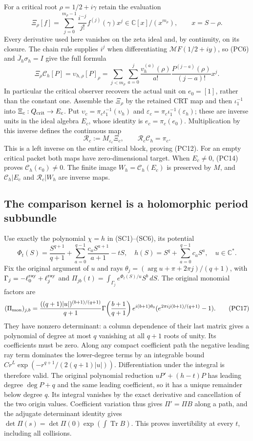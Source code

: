 \documentclass{article}
\begin{document}
For a critical root $\rho=1/2+i\gamma$ retain the evaluation
\[
 \Xi_\rho[f]=\sum_{j=0}^{m_\rho-1}
       \frac{i^{-j}}{j!}f^{(j)}(\gamma)x^j
       \in\mathbb C[x]/(x^{m_\rho}),\qquad x=S-\rho.
 \tag{PC13}
\]
Every derivative used here vanishes on the zeta ideal and, by
continuity, on its closure.  The chain rule supplies $i^j$ when
differentiating $\mathcal MF(1/2+iy)$, so (PC6) and
$\overline J_h\sigma_h=I$ give the full formula
\[
 \Xi_\rho\mathcal C_h[P]
 =\upsilon_{h,\rho}[P]_\rho
 =\sum_{j<m_\rho}\sum_{a=0}^j
   \frac{v_h^{(a)}(\rho)}{a!}
   \frac{P^{(j-a)}(\rho)}{(j-a)!}x^j.
 \tag{PC14}
\]
In particular the critical observer recovers the actual unit on
$e_0=[1]$, rather than the constant one.  Assemble the $\Xi_\rho$
by the retained CRT map and then $\iota_1^{-1}$ into
$\Xi_c:Q_{\rm crit}\to E_c$.  Put
$\upsilon_c=\pi_c\iota_1^{-1}(\upsilon_h)$ and
$\varepsilon_c=\pi_c\iota_1^{-1}(\varepsilon_h)$; these are
inverse units in the ideal algebra $E_c$, whose identity is
$e_c=\pi_c(e_0)$.  Multiplication by this inverse defines the continuous map
\[
 \mathcal R_c:=M_{\varepsilon_c}\Xi_c,
 \qquad \mathcal R_c\mathcal C_h=\pi_c.
 \tag{PC15}
\]
This is a left inverse on the entire critical block, proving (PC12).
For an empty critical packet both maps have zero-dimensional target.
When $E_c\ne0$, (PC14) proves $\mathcal C_h(e_0)\ne0$.
The finite image $W_h=\mathcal C_h(E_c)$ is preserved by $M$,
and $\mathcal C_h|E_c$ and $\mathcal R_c|W_h$ are inverse maps.

\subsection{The comparison kernel is a holomorphic period subbundle}

Use exactly the polynomial $\chi=h$ in (SC1)--(SC6), its potential
\[
 \Phi_t(S)=\frac{S^{q+1}}{q+1}
   +\sum_{a=0}^{q-1}\frac{c_aS^{a+1}}{a+1}-tS,
 \quad h(S)=S^q+\sum_{a=0}^{q-1}c_aS^a,
 \quad u\in\mathbb C^*.
 \tag{PC16}
\]
Fix the original argument of $u$ and rays
$\theta_j=(\arg u+\pi+2\pi j)/(q+1)$, with
$\Gamma_j=-\ell_0^{\rm ray}+\ell_j^{\rm ray}$ and
$\Pi_{jb}(t)=\int_{\Gamma_j}e^{\Phi_t(S)/u}S^b\,dS$.
The original monomial factors are
\[
 (\Pi_{\rm mon})_{j,b}=
 \frac{((q+1)|u|)^{(b+1)/(q+1)}}{q+1}
 \Gamma\!\left(\frac{b+1}{q+1}\right)e^{i(b+1)\theta_0}
 (e^{2\pi i j(b+1)/(q+1)}-1).
 \tag{PC17}
\]
They have nonzero determinant: a column dependence of their last
matrix gives a polynomial of degree at most $q$ vanishing at all
$q+1$ roots of unity.  Its coefficients must be zero.  Along any
compact coefficient path the negative leading ray term dominates
the lower-degree terms by an integrable bound
$Cr^L\exp(-r^{q+1}/(2(q+1)|u|))$.  Differentiation under the
integral is therefore valid.  The original polynomial reduction
$uP'+(h-t)P$ has leading degree $\deg P+q$ and the same leading
coefficient, so it has a unique remainder below degree $q$.
Its integral vanishes by the exact derivative and cancellation of
the two origin values.  Coefficient variation thus gives
$\Pi'=\Pi B$ along a path, and the adjugate determinant identity
gives $\det\Pi(s)=\det\Pi(0)\exp(\int\operatorname{Tr}B)$.
This proves invertibility at every $t$, including all collisions.
\end{document}
